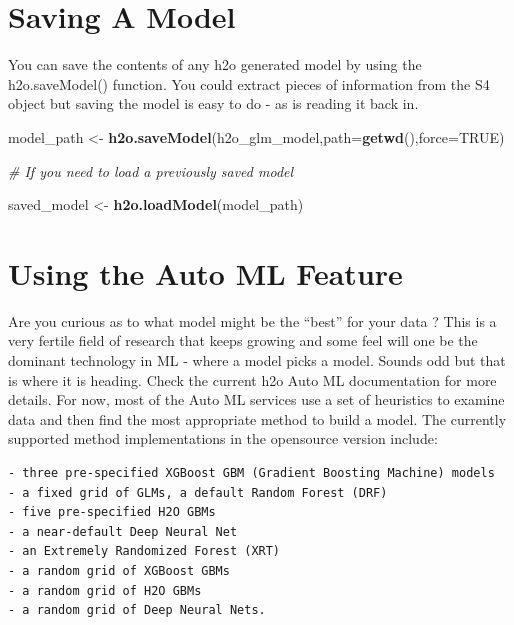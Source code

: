 \documentclass[
]{book}
\newenvironment{Shaded}{\begin{snugshade}}{\end{snugshade}}
\newcommand{\CommentTok}[1]{\textcolor[rgb]{0.56,0.35,0.01}{\textit{#1}}}
\newcommand{\DataTypeTok}[1]{\textcolor[rgb]{0.13,0.29,0.53}{#1}}
\newcommand{\KeywordTok}[1]{\textcolor[rgb]{0.13,0.29,0.53}{\textbf{#1}}}
\newcommand{\NormalTok}[1]{#1}
\newcommand{\OtherTok}[1]{\textcolor[rgb]{0.56,0.35,0.01}{#1}}
\newcommand{\StringTok}[1]{\textcolor[rgb]{0.31,0.60,0.02}{#1}}
\begin{document}
\hypertarget{saving-a-model}{%
\section{Saving A Model}\label{saving-a-model}}

You can save the contents of any h2o generated model by using the h2o.saveModel() function. You could extract pieces of information from the S4 object but saving the model is easy to do - as is reading it back in.

\begin{Shaded}
\begin{Highlighting}[]
\NormalTok{model_path <-}\StringTok{ }\KeywordTok{h2o.saveModel}\NormalTok{(h2o_glm_model,}\DataTypeTok{path=}\KeywordTok{getwd}\NormalTok{(),}\DataTypeTok{force=}\OtherTok{TRUE}\NormalTok{)}

\CommentTok{# If you need to load a previously saved model}

\NormalTok{saved_model <-}\StringTok{ }\KeywordTok{h2o.loadModel}\NormalTok{(model_path)}
\end{Highlighting}
\end{Shaded}

\hypertarget{using-the-auto-ml-feature}{%
\section{Using the Auto ML Feature}\label{using-the-auto-ml-feature}}

Are you curious as to what model might be the ``best'' for your data ? This is a very fertile field of research that keeps growing and some feel will one be the dominant technology in ML - where a model picks a model. Sounds odd but that is where it is heading. Check the current h2o Auto ML documentation for more details. For now, most of the Auto ML services use a set of heuristics to examine data and then find the most appropriate method to build a model. The currently supported method implementations in the opensource version include:

\begin{verbatim}
- three pre-specified XGBoost GBM (Gradient Boosting Machine) models
- a fixed grid of GLMs, a default Random Forest (DRF)
- five pre-specified H2O GBMs
- a near-default Deep Neural Net
- an Extremely Randomized Forest (XRT)
- a random grid of XGBoost GBMs
- a random grid of H2O GBMs
- a random grid of Deep Neural Nets.
\end{verbatim}
\end{document}
